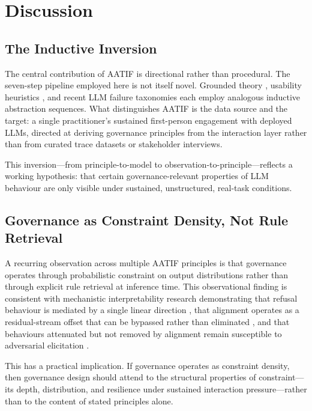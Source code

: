 \documentclass[11pt,a4paper]{article}
\begin{document}
\section{Discussion}

\subsection{The Inductive Inversion}

The central contribution of AATIF is directional rather than procedural. The seven-step pipeline employed here is not itself novel. Grounded theory \citep{glaser1967}, usability heuristics \citep{nielsen1990}, and recent LLM failure taxonomies \citep{cemri2025} each employ analogous inductive abstraction sequences. What distinguishes AATIF is the data source and the target: a single practitioner's sustained first-person engagement with deployed LLMs, directed at deriving governance principles from the interaction layer rather than from curated trace datasets or stakeholder interviews.

This inversion---from principle-to-model to observation-to-principle---reflects a working hypothesis: that certain governance-relevant properties of LLM behaviour are only visible under sustained, unstructured, real-task conditions.

\subsection{Governance as Constraint Density, Not Rule Retrieval}

A recurring observation across multiple AATIF principles is that governance operates through probabilistic constraint on output distributions rather than through explicit rule retrieval at inference time. This observational finding is consistent with mechanistic interpretability research demonstrating that refusal behaviour is mediated by a single linear direction \citep{arditi2024}, that alignment operates as a residual-stream offset that can be bypassed rather than eliminated \citep{lee2024}, and that behaviours attenuated but not removed by alignment remain susceptible to adversarial elicitation \citep{wolf2024}.

This has a practical implication. If governance operates as constraint density, then governance design should attend to the structural properties of constraint---its depth, distribution, and resilience under sustained interaction pressure---rather than to the content of stated principles alone.
\end{document}
